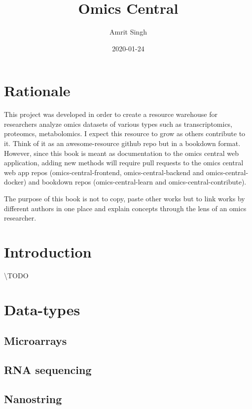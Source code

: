 \documentclass[]{book}
\title{Omics Central}
\author{Amrit Singh}
\date{2020-01-24}
\begin{document}
\maketitle

{
\setcounter{tocdepth}{1}
\tableofcontents
}
\chapter{Rationale}\label{rationale}

This project was developed in order to create a resource warehouse for
researchers analyze omics datasets of various types such as
transcriptomics, proteomcs, metabolomics. I expect this resource to grow
as others contribute to it. Think of it as an awesome-resource github
repo but in a bookdown format. However, since this book is meant as
documentation to the omics central web application, adding new methods
will require pull requests to the omics central web app repos
(omics-central-frontend, omics-central-backend and omics-central-docker)
and bookdown repos (omics-central-learn and omics-central-contribute).

The purpose of this book is not to copy, paste other works but to link
works by different authors in one place and explain concepts through the
lens of an omics researcher.

\chapter{Introduction}\label{intro}

\textbackslash{}TODO

\chapter{Data-types}\label{data-types}

\section{Microarrays}\label{microarrays}

\section{RNA sequencing}\label{rna-sequencing}

\section{Nanostring}\label{nanostring}
\end{document}
